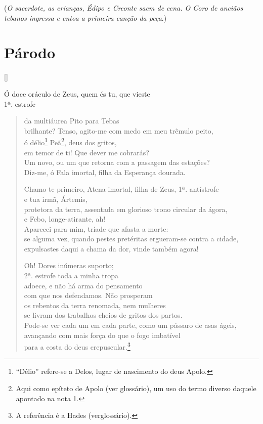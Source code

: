 (\emph{O sacerdote, as crianças, Édipo e Creonte saem de cena. O Coro de
anciãos tebanos ingressa e entoa a primeira canção da peça}.)


\section{Párodo}

\hfill []

Ó doce oráculo de Zeus, quem és tu, que vieste\\ 1ª. estrofe
\begin{verse}da multiáurea Pito para Tebas\\
brilhante? Tenso, agito-me com medo em meu trêmulo peito,\\
ó délio\footnote{``Délio'' refere-se a Delos, lugar de nascimento do
deus Apolo.} Peã\footnote{Aqui como epíteto de Apolo (ver glossário),
um uso do termo diverso daquele apontado na nota 1.}, deus dos gritos,\\
em temor de ti! Que dever me cobrarás?\\
Um novo, ou um que retorna com a passagem das estações?\\
Diz-me, ó Fala imortal, filha da Esperança dourada.

Chamo-te primeiro, Atena imortal, filha de Zeus, 1ª. antístrofe\\
e tua irmã, Ártemis, \\
protetora da terra, assentada em glorioso trono circular da ágora,\\
e Febo, longe-atirante, ah!\\
Aparecei para mim, tríade que afasta a morte:\\
se alguma vez, quando pestes pretéritas ergueram-se contra a cidade,\\
expulsastes daqui a chama da dor, vinde também agora!

Oh! Dores inúmeras suporto;\\ 2ª. estrofe
toda a minha tropa\\
adoece, e não há arma do pensamento \\
com que nos defendamos. Não prosperam\\
os rebentos da terra renomada, nem mulheres\\
se livram dos trabalhos cheios de gritos dos partos.\\
Pode-se ver cada um em cada parte, como um pássaro de asas ágeis,\\
avançando com mais força do que o fogo imbatível\\
para a costa do deus crepuscular.\footnote{A referência é a Hades (verglossário).}


\end{verse}
